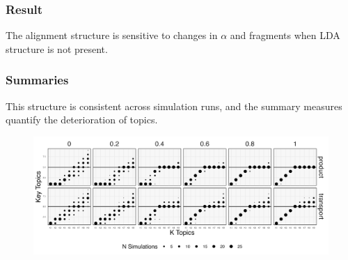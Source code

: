 \documentclass{beamer}
\begin{document}
\begin{frame}
  \frametitle{Result}
  The alignment structure is sensitive to changes in $\alpha$ and fragments when
  LDA structure is not present.

\begin{figure}
    \hfil
\end{figure}

\end{frame}

\begin{frame}
  \frametitle{Summaries}
  This structure is consistent across simulation runs, and the summary measures
  quantify the deterioration of topics.
\begin{figure}
    \includegraphics[width=\textwidth]{gradient_key_topics}
\end{figure}
\end{frame}
\end{document}
